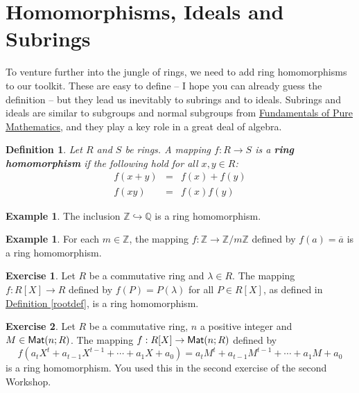 \documentclass[11pt]{amsbook}
\newtheorem{definition}[theorem]{Definition}
\theoremstyle{definition}
\newtheorem{ex}[theorem]{Example}
\newtheorem{exercise}{Exercise}
\begin{document}
\section{Homomorphisms, Ideals and Subrings}
\label{quotientsec}
To venture further into the jungle of rings, we need to add ring homomorphisms to our toolkit. These are easy to define -- I hope you can already guess the definition -- but they lead us inevitably to subrings and to ideals. Subrings and ideals are similar to subgroups and normal subgroups from \href{http://www.drps.ed.ac.uk/12-13/dpt/cxmath08064.htm}{Fundamentals of Pure Mathematics}, and they play a key role in a great deal of algebra.

\begin{definition}\label{ringmorphism}
Let $R$ and $S$ be rings. A mapping $f: R\longrightarrow S$ is a \textbf{ring homomorphism} if the following hold for all $x,y\in R$:
\begin{eqnarray*}
f (x+y)  &=& f(x) + f(y) \\
f(xy)  &=& f(x) f(y)
\end{eqnarray*}
\end{definition}

\begin{ex} \label{ex1} The inclusion $\mathbb{Z}\hookrightarrow \mathbb{Q}$ is a ring homomorphism.
\end{ex}

\begin{ex} \label{ex2}
For each $m\in \mathbb{Z}$, the mapping $f: \mathbb{Z} \to \mathbb{Z}/m\mathbb{Z}$ defined by $f(a) = \overline{a}$ is a ring homomorphism.
\end{ex}

\begin{exercise} \label{ex3}
Let $R$ be a commutative ring and $\lambda \in R$. The mapping $f: R[X]\to R$ defined by $f(P) = P(\lambda)$ for all $P\in R[X]$, as defined in \hyperref[rootdef]{Definition \ref{rootdef}}, is a ring homomorphism.
\end{exercise}

\begin{exercise}
\label{ex4}
Let $R$ be a commutative ring, $n$ a positive integer and $M\in {\sf Mat}(n; R)$. The mapping $f: R[X]\to {\sf Mat}(n;R)$ defined by $$f(a_tX^t + a_{t-1}X^{t-1}+ \cdots + a_1X + a_0) = a_tM^t + a_{t-1}M^{t-1} + \cdots + a_1M + a_0$$ is a ring homomorphism. You used this in the second exercise of the second Workshop.
\end{exercise}
\end{document}
